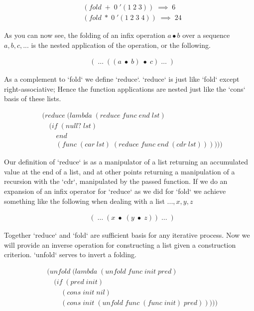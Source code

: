 \begin{align*}
& (fold \; + \; 0 \; '(1 \; 2 \; 3)) \; \implies \; 6
\\& (fold \; * \; 0 \; '(1 \; 2 \; 3 \; 4)) \; \implies \; 24
\end{align*}

As you can now see, the folding of an infix operation $a \bullet b$ over a 
sequence $a, b, c, ...$ is the nested application of the operation, or the 
following.

\begin{align*}
& ( \; \dots \; ((a \; \bullet \; b) \; \bullet \; c) \; \dots \; )
\end{align*}

As a complement to `fold` we define `reduce`. `reduce` is just like `fold` except 
right-associative; Hence the function applications are nested just like the `cons` 
basis of these lists.

\begin{align*}
& (reduce \; (lambda \; (reduce \; func \; end \; lst)
\\& \quad (if \; (null? \; lst)
\\& \qquad end
\\& \qquad (func \; (car \; lst) \; (reduce \; func \; end \; (cdr \; lst))))))
\end{align*}

Our definition of `reduce` is as a manipulator of a list returning an accumulated 
value at the end of a list, and at other points returning a manipulation of a 
recursion with the `cdr`, manipulated by the passed function. If we do an 
expansion of an infix operator for `reduce` as we did for `fold` we achieve 
something like the following when dealing with a list $... , x, y, z$

\begin{align*}
& ( \; \dots \; (x \; \bullet \; (y \; \bullet \; z)) \; \dots \; )
\end{align*}

Together `reduce` and `fold` are sufficient basis for any iterative process. Now 
we will provide an inverse operation for constructing a list given a construction 
criterion. `unfold` serves to invert a folding.

\begin{align*}
& (unfold \; (lambda \; (unfold \; func \; init \; pred)
\\& \quad (if \; (pred \; init)
\\& \qquad (cons \; init \; nil)
\\& \qquad (cons \; init \; (unfold \; func \; (func \; init) \; pred)))))
\end{align*}

